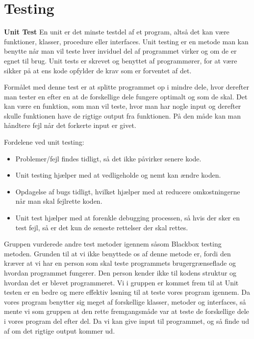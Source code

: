 \section{Testing}\label{Testing}

\textbf{Unit Test} \newline
En unit er det minste testdel af et program, altså det kan være funktioner, klasser, procedure eller interfaces. Unit testing er en metode man kan benytte når man vil teste hver inviduel del af programmet virker og om de er egnet til brug. Unit tests er skrevet og benyttet af programmører, for at være sikker på at ens kode opfylder de krav som er forventet af det. 

\vspace{5mm}

Formålet med denne test er at splitte programmet op i mindre dele, hvor derefter man tester en efter en at de forskellige dele fungere optimalt og som de skal. Det kan være en funktion, som man vil teste, hvor man har nogle input og derefter skulle funktionen have de rigtige output fra funktionen. På den måde kan man håndtere fejl når det forkerte input er givet.

\vspace{5mm}

Fordelene ved unit testing:
\begin{itemize}
\item Problemer/fejl findes tidligt, så det ikke påvirker senere kode.
\item Unit testing hjælper med at vedligeholde og nemt kan ændre koden.
\item Opdagelse af bugs tidligt, hvilket hjælper med at reducere omkostningerne når man skal fejlrette koden.
\item Unit test hjælper med at forenkle debugging processen, så hvis der sker en test fejl, så er det kun de seneste rettelser der skal rettes.
\end{itemize}\cite{unittestbenefits}

Gruppen vurderede andre test metoder igennem såsom Blackbox testing metoden. Grunden til at vi ikke benyttede os af denne metode er, fordi den kræver at vi har en person som skal teste programmets brugergrænseflade og hvordan programmet fungerer. Den person kender ikke til kodens struktur og hvordan det er blevet programmeret. Vi i gruppen er kommet frem til at Unit testen er en bedre og mere effektiv løsning til at teste vores program igennem. Da vores program benytter sig meget af forskellige klasser, metoder og interfaces, så mente vi som gruppen at den rette fremgangsmåde var at teste de forskellige dele i vores program del efter del. Da vi kan give input til programmet, og så finde ud af om det rigtige output kommer ud.
